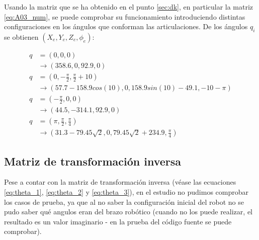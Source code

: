 \documentclass[a4paper,12pt]{article}
\begin{document}
Usando la matriz que se ha obtenido en el punto \ref{sec:dk}, en particular la
matriz \ref{eq:A03_num}, se puede comprobar su funcionamiento introduciendo
distintas configuraciones en los ángulos que conforman las articulaciones.
De los ángulos $q_i$ se obtienen $(X_e, Y_e, Z_e, \phi_e)$:

\begin{align*}
    q &= \left(0, 0, 0\right) \\
    &\rightarrow \left(358.6, 0, 92.9, 0\right) \\
    q &= \left(0, -\frac{\pi}{2}, \frac{\pi}{2} + 10\right) \\
    &\rightarrow \left(57.7 - 158.9cos(10), 0, 158.9sin(10) - 49.1, -10 - \pi\right) \\
    q &= \left(-\frac{\pi}{2}, 0, 0\right) \\
    &\rightarrow \left(44.5, -314.1, 92.9, 0\right) \\
    q &= \left(\pi, \frac{\pi}{2}, \frac{\pi}{4}\right) \\
    &\rightarrow \left(31.3 - 79.45\sqrt{2}, 0, 79.45\sqrt{2} + 234.9, \frac{\pi}{4}\right)
\end{align*}

\subsection{Matriz de transformación inversa}

Pese a contar con la matriz de transformación inversa (véase las ecuaciones 
\ref{eq:theta_1}, \ref{eq:theta_2} y \ref{eq:theta_3}), en el estudio no pudimos
comprobar los casos de prueba, ya que al no saber la configuración inicial del robot
no se pudo saber qué angulos eran del brazo robótico (cuando no los puede realizar,
el resultado es un valor imaginario - en la prueba del código fuente se puede comprobar).
\end{document}
